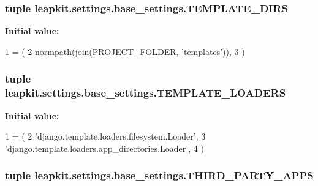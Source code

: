 \hypertarget{namespaceleapkit_1_1settings_1_1base__settings_a61d895198561c82a92ebcd0e7210fadd}{
\subsubsection[{T\-E\-M\-P\-L\-A\-T\-E\-\_\-\-D\-I\-R\-S}]{\setlength{\rightskip}{0pt plus 5cm}tuple leapkit.\-settings.\-base\-\_\-settings.\-T\-E\-M\-P\-L\-A\-T\-E\-\_\-\-D\-I\-R\-S}}\label{namespaceleapkit_1_1settings_1_1base__settings_a61d895198561c82a92ebcd0e7210fadd}
{\bfseries Initial value\-:}
\begin{DoxyCode}
1 = (
2     normpath(join(PROJECT\_FOLDER, \textcolor{stringliteral}{'templates'})),
3 )
\end{DoxyCode}
\hypertarget{namespaceleapkit_1_1settings_1_1base__settings_a97efc8d69a72e9c1a3d681fd7bf6d06f}{
\subsubsection[{T\-E\-M\-P\-L\-A\-T\-E\-\_\-\-L\-O\-A\-D\-E\-R\-S}]{\setlength{\rightskip}{0pt plus 5cm}tuple leapkit.\-settings.\-base\-\_\-settings.\-T\-E\-M\-P\-L\-A\-T\-E\-\_\-\-L\-O\-A\-D\-E\-R\-S}}\label{namespaceleapkit_1_1settings_1_1base__settings_a97efc8d69a72e9c1a3d681fd7bf6d06f}
{\bfseries Initial value\-:}
\begin{DoxyCode}
1 = (
2     \textcolor{stringliteral}{'django.template.loaders.filesystem.Loader'},
3     \textcolor{stringliteral}{'django.template.loaders.app\_directories.Loader'},
4 )
\end{DoxyCode}
\hypertarget{namespaceleapkit_1_1settings_1_1base__settings_add1b025eed8aa5becfc6a18a0531c7d2}{
\subsubsection[{T\-H\-I\-R\-D\-\_\-\-P\-A\-R\-T\-Y\-\_\-\-A\-P\-P\-S}]{\setlength{\rightskip}{0pt plus 5cm}tuple leapkit.\-settings.\-base\-\_\-settings.\-T\-H\-I\-R\-D\-\_\-\-P\-A\-R\-T\-Y\-\_\-\-A\-P\-P\-S}}\label{namespaceleapkit_1_1settings_1_1base__settings_add1b025eed8aa5becfc6a18a0531c7d2}
